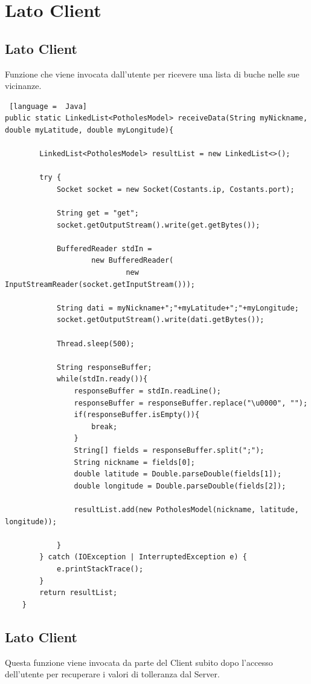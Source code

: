 \documentclass[a4paper,11pt]{report}
\begin{document}
\section{\Large{\textbf{Lato Client}}}

\subsection{Lato Client}
Funzione che viene invocata dall'utente per ricevere una lista di buche nelle sue vicinanze. 

\begin{lstlisting} [language =  Java]
public static LinkedList<PotholesModel> receiveData(String myNickname, double myLatitude, double myLongitude){

        LinkedList<PotholesModel> resultList = new LinkedList<>();

        try {
            Socket socket = new Socket(Costants.ip, Costants.port);

            String get = "get";
            socket.getOutputStream().write(get.getBytes());

            BufferedReader stdIn =
                    new BufferedReader(
                            new InputStreamReader(socket.getInputStream()));

            String dati = myNickname+";"+myLatitude+";"+myLongitude;
            socket.getOutputStream().write(dati.getBytes());

            Thread.sleep(500);

            String responseBuffer;
            while(stdIn.ready()){
                responseBuffer = stdIn.readLine();
                responseBuffer = responseBuffer.replace("\u0000", "");
                if(responseBuffer.isEmpty()){
                    break;
                }
                String[] fields = responseBuffer.split(";");
                String nickname = fields[0];
                double latitude = Double.parseDouble(fields[1]);
                double longitude = Double.parseDouble(fields[2]);

                resultList.add(new PotholesModel(nickname, latitude, longitude));

            }
        } catch (IOException | InterruptedException e) {
            e.printStackTrace();
        }
        return resultList;
    }

\end{lstlisting}

\subsection{Lato Client}
Questa funzione viene invocata da parte del Client subito dopo l'accesso dell'utente per recuperare i valori di tolleranza dal Server.
\end{document}
